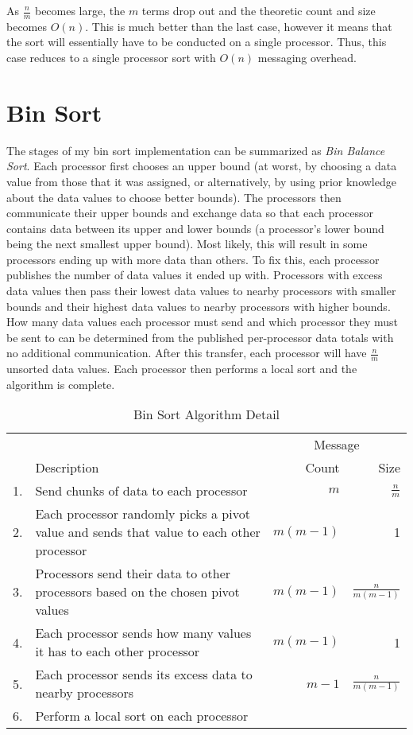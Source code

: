 \documentclass[10pt]{article}
\begin{document}
As \(\frac{n}{m}\) becomes large, the \(m\) terms drop out and the theoretic count and size becomes \(O(n)\). This is much better than the last case, however it means that the sort will essentially have to be conducted on a single processor. Thus, this case reduces to a single processor sort with \(O(n)\) messaging overhead.

\section{Bin Sort}

The stages of my bin sort implementation can be summarized as \emph{Bin Balance Sort}. Each processor first chooses an upper bound (at worst, by choosing a data value from those that it was assigned, or alternatively, by using prior knowledge about the data values to choose better bounds). The processors then communicate their upper bounds and exchange data so that each processor contains data between its upper and lower bounds (a processor's lower bound being the next smallest upper bound). Most likely, this will result in some processors ending up with more data than others. To fix this, each processor publishes the number of data values it ended up with. Processors with excess data values then pass their lowest data values to nearby processors with smaller bounds and their highest data values to nearby processors with higher bounds. How many data values each processor must send and which processor they must be sent to can be determined from the published per-processor data totals with no additional communication. After this transfer, each processor will have \( \frac{n}{m} \) unsorted data values. Each processor then performs a local sort and the algorithm is complete.

\begin{table}
\caption{Bin Sort Algorithm Detail}
\label{bin-sort-table}
\begin{tabular}{lp{11.5cm}rr}
\toprule
   &             &  \multicolumn{2}{c}{Message} \\
\cmidrule(r){3-4}
   & Description & Count & Size \\
\midrule
1. & Send chunks of data to each processor                          & \(m\)      & \( \frac{n}{m} \)      \\
2. & Each processor randomly picks a pivot value and sends that value to each other processor & \(m(m-1)\) & 1 \\
3. & Processors send their data to other processors based on the chosen pivot values & \(m(m-1)\) & \( \frac{n}{m(m-1)} \) \\
4. & Each processor sends how many values it has to each other processor & \(m(m-1)\) & 1                 \\
5. & Each processor sends its excess data to nearby processors      & \(m-1\)    & \( \frac{n}{m(m-1)} \)\footnotemark \\
6. & Perform a local sort on each processor                                                               \\
\bottomrule
\end{tabular}
\end{table}
\end{document}
